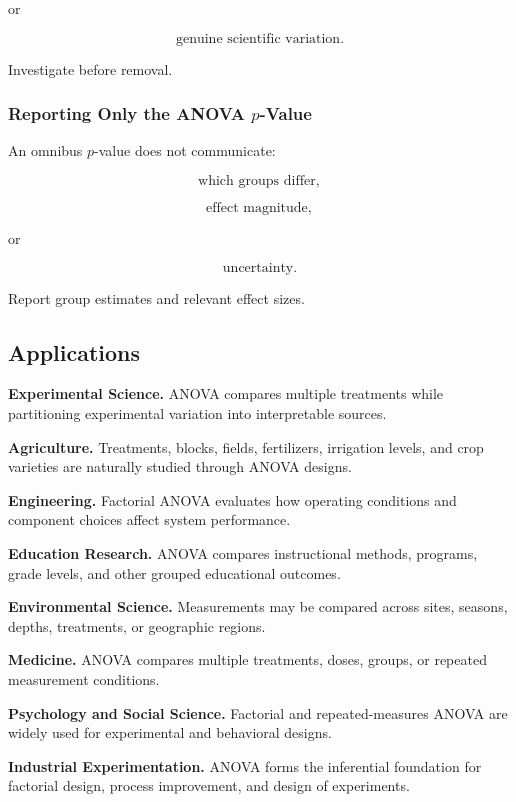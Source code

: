 or

\[
\boxed{
\text{genuine scientific variation}.
}
\]

Investigate before removal.

\subsubsection{Reporting Only the ANOVA \(p\)-Value}

An omnibus \(p\)-value does not communicate:

\[
\boxed{
\text{which groups differ},
}
\]

\[
\boxed{
\text{effect magnitude},
}
\]

or

\[
\boxed{
\text{uncertainty}.
}
\]

Report group estimates and relevant effect sizes.

\subsection{Applications}
\label{subsec:anova-applications}

\begin{applicationbox}

\textbf{Experimental Science.}
ANOVA compares multiple treatments while partitioning experimental
variation into interpretable sources.

\medskip

\textbf{Agriculture.}
Treatments, blocks, fields, fertilizers, irrigation levels, and crop
varieties are naturally studied through ANOVA designs.

\medskip

\textbf{Engineering.}
Factorial ANOVA evaluates how operating conditions and component choices
affect system performance.

\medskip

\textbf{Education Research.}
ANOVA compares instructional methods, programs, grade levels, and other
grouped educational outcomes.

\medskip

\textbf{Environmental Science.}
Measurements may be compared across sites, seasons, depths, treatments,
or geographic regions.

\medskip

\textbf{Medicine.}
ANOVA compares multiple treatments, doses, groups, or repeated
measurement conditions.

\medskip

\textbf{Psychology and Social Science.}
Factorial and repeated-measures ANOVA are widely used for experimental
and behavioral designs.

\medskip

\textbf{Industrial Experimentation.}
ANOVA forms the inferential foundation for factorial design, process
improvement, and design of experiments.

\end{applicationbox}

